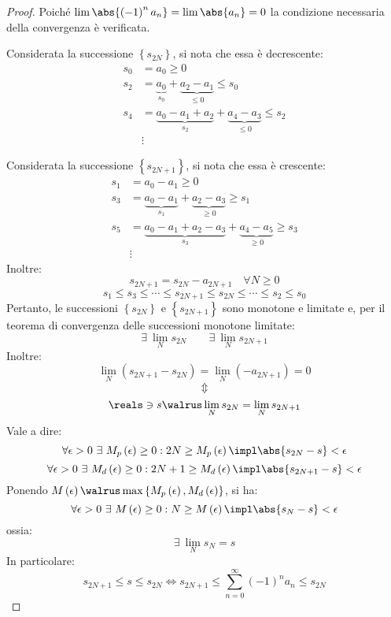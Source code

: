 \begin{proof}
  Poiché $\lim \abs{\left( -1 \right)^na_n}=\lim \abs{a_n}=0$ la condizione necessaria della convergenza è verificata.
  
  \noindent Considerata la successione $\left\{ s_{2N} \right\}$, si nota che essa è decrescente:
  \begin{align*}
    s_0 & =a_0\ge0                                                           \\
    s_2 & =\underbrace{a_0}_{s_0}+\underbrace{a_2-a_1}_{\le0}\le s_0         \\
    s_4 & =\underbrace{a_0-a_1+a_2}_{s_2}+\underbrace{a_4-a_3}_{\le0}\le s_2 \\
        & \vdots                                                             
  \end{align*}
  
  \noindent Considerata la successione $\left\{ s_{2N+1} \right\}$, si nota che essa è crescente:
  \begin{align*}
    s_1 & =a_0-a_1\ge0                                                           \\
    s_3 & =\underbrace{a_0-a_1}_{s_1}+\underbrace{a_2-a_3}_{\ge0}\ge s_1         \\
    s_5 & =\underbrace{a_0-a_1+a_2-a_3}_{s_3}+\underbrace{a_4-a_5}_{\ge0}\ge s_3 \\
        & \vdots                                                                 
  \end{align*}
  Inoltre:
  $$s_{2N+1}=s_{2N}-a_{2N+1}\quad\forall N\ge0$$
  $$s_1\le s_3\le \cdots\le s_{2N+1}\le s_{2N}\le \cdots \le s_2\le s_0$$
  Pertanto, le successioni $\left\{ s_{2N} \right\}$ e $\left\{ s_{2N+1} \right\}$ sono monotone e limitate e, per il teorema di convergenza delle successioni monotone limitate:
  $$\exists\ \lim_{N}s_{2N}\qquad \exists\ \lim_{N}s_{2N+1}$$
  Inoltre:
  $$\lim_N\left( s_{2N+1}-s_{2N} \right)=\lim_N\left( -a_{2N+1} \right)=0$$
  $$\Updownarrow$$
  $$\reals\ni s\walrus\lim_Ns_{2N}=\lim_Ns_{2N+1}$$
  Vale a dire:
  $$\forall \epsilon>0\ \exists\ M_p\left( \epsilon \right)\ge0:2N\ge M_p\left( \epsilon \right)\impl\abs{s_{2N}-s}<\epsilon$$
  $$\forall \epsilon>0\ \exists\ M_d\left( \epsilon \right)\ge0:2N+1\ge M_d\left( \epsilon \right)\impl\abs{s_{2N+1}-s}<\epsilon$$
  Ponendo $M\left( \epsilon \right)\walrus \max\left\{ M_p\left( \epsilon \right),M_d\left( \epsilon \right) \right\}$, si ha:
  $$\forall \epsilon>0\ \exists\ M\left( \epsilon \right)\ge0:N\ge M\left( \epsilon \right)\impl\abs{s_N-s}<\epsilon$$
  ossia:
  $$\exists\ \lim_{N}s_N=s$$
  In particolare:
  $$s_{2N+1}\le s\le s_{2N}\iff s_{2N+1}\le \sum_{n=0}^\infty\left( -1 \right)^na_n\le s_{2N}$$
  

\end{proof}
